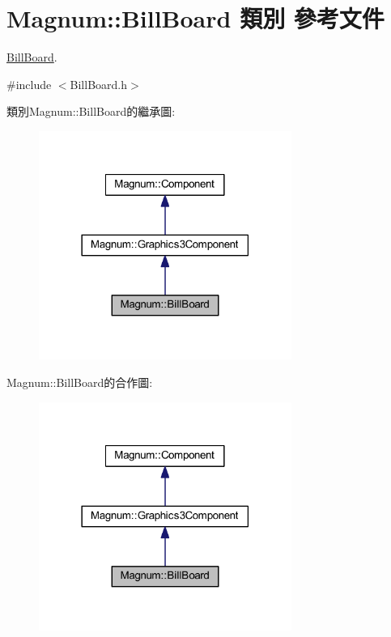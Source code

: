 \hypertarget{class_magnum_1_1_bill_board}{}\section{Magnum\+:\+:Bill\+Board 類別 參考文件}
\label{class_magnum_1_1_bill_board}


\hyperlink{class_magnum_1_1_bill_board}{Bill\+Board}.  




{\ttfamily \#include $<$Bill\+Board.\+h$>$}



類別\+Magnum\+:\+:Bill\+Board的繼承圖\+:\nopagebreak
\begin{figure}[H]
\begin{center}
\leavevmode
\includegraphics[width=234pt]{class_magnum_1_1_bill_board__inherit__graph}
\end{center}
\end{figure}


Magnum\+:\+:Bill\+Board的合作圖\+:\nopagebreak
\begin{figure}[H]
\begin{center}
\leavevmode
\includegraphics[width=234pt]{class_magnum_1_1_bill_board__coll__graph}
\end{center}
\end{figure}
